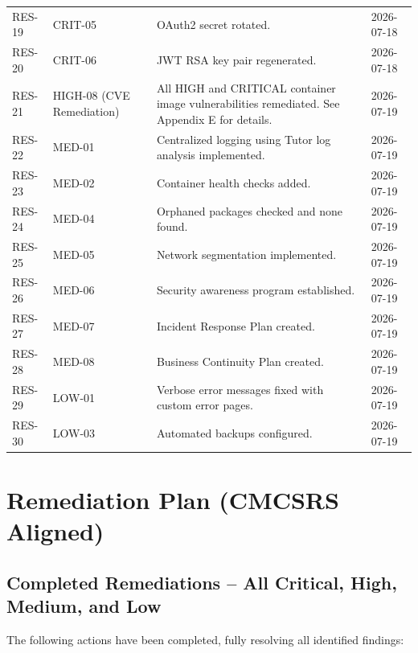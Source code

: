 \begin{center}
\begin{tabular}{|p{}|p{}|p{}|p{}|}
RES-19 & CRIT-05 & OAuth2 secret rotated. & 2026-07-18 \\
RES-20 & CRIT-06 & JWT RSA key pair regenerated. & 2026-07-18 \\
RES-21 & HIGH-08 (CVE Remediation) & All HIGH and CRITICAL container image vulnerabilities remediated. See Appendix E for details. & 2026-07-19 \\
RES-22 & MED-01 & Centralized logging using Tutor log analysis implemented. & 2026-07-19 \\
RES-23 & MED-02 & Container health checks added. & 2026-07-19 \\
RES-24 & MED-04 & Orphaned packages checked and none found. & 2026-07-19 \\
RES-25 & MED-05 & Network segmentation implemented. & 2026-07-19 \\
RES-26 & MED-06 & Security awareness program established. & 2026-07-19 \\
RES-27 & MED-07 & Incident Response Plan created. & 2026-07-19 \\
RES-28 & MED-08 & Business Continuity Plan created. & 2026-07-19 \\
RES-29 & LOW-01 & Verbose error messages fixed with custom error pages. & 2026-07-19 \\
RES-30 & LOW-03 & Automated backups configured. & 2026-07-19 \\
\hline
\end{tabular}
\end{center}

\section{Remediation Plan (CMCSRS Aligned)}

\subsection{Completed Remediations – All Critical, High, Medium, and Low}

The following actions have been completed, fully resolving all identified findings:

